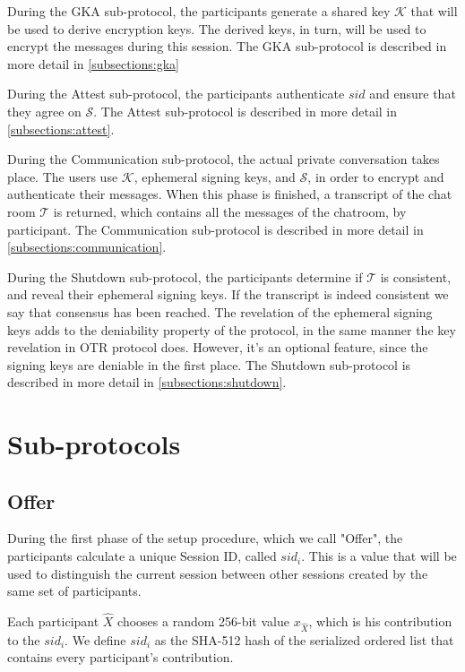 During the GKA sub-protocol, the participants generate a shared key $\mathcal{K}$ that will be used to derive encryption keys. The derived keys, in turn, will be used to encrypt the messages during this session. The GKA sub-protocol is described in more detail in \ref{subsections:gka}

During the Attest sub-protocol, the participants authenticate $sid$ and ensure that they agree on $\mathcal{S}$. The Attest sub-protocol is described in more detail in \ref{subsections:attest}. 

During the Communication sub-protocol, the actual private conversation takes place. The users use $\mathcal{K}$, ephemeral signing keys, and $\mathcal{S}$, in order to encrypt and authenticate their messages. When this phase is finished, a transcript of the chat room $\mathcal{T}$ is returned, which contains all the messages of the chatroom, by participant. The Communication sub-protocol is described in more detail in \ref{subsections:communication}. 

During the Shutdown sub-protocol, the participants determine if $\mathcal{T}$ is consistent, and reveal their ephemeral signing keys. If the transcript is indeed consistent we say that consensus has been reached. The revelation of the ephemeral signing keys adds to the deniability property of the protocol, in the same manner the key revelation in OTR protocol does. However, it’s an optional feature, since the signing keys are deniable in the first place. The Shutdown sub-protocol is described in more detail in \ref{subsections:shutdown}. 


\section{Sub-protocols}

\subsection{Offer}
\label{subsections:offer}
During the first phase of the setup procedure, which we call "Offer", the participants calculate a unique Session ID, called $sid_i$. This is a value that will be used to distinguish the current session between other sessions created by the same set of participants.

Each participant $\hat{X}$ chooses a random 256-bit value $x_{\hat{X}}$, which is his contribution to the $sid_i$. We define $sid_i$ as the SHA-512 hash of the serialized ordered list that contains every participant's contribution.

